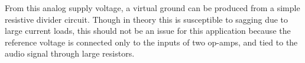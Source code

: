 	From this analog supply voltage, a virtual ground can be produced from a simple resistive divider circuit.  Though in theory this is susceptible to sagging due to large current loads, this should not be an issue for this application because the reference voltage is connected only to the inputs of two op-amps, and tied to the audio signal through large resistors.
